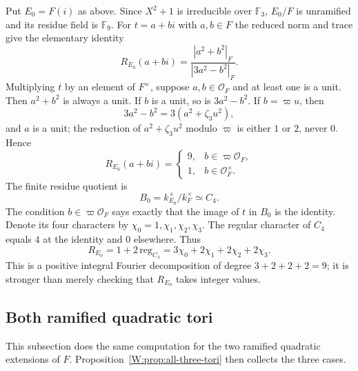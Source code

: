 Put $E_0=F(i)$ as above.  Since $X^2+1$ is irreducible over
$\mathbb F_3$, $E_0/F$ is unramified and its residue field is
$\mathbb F_9$.  For $t=a+bi$ with $a,b\in F$ the reduced norm
and trace give the elementary identity
\begin{equation}\label{W:eq:quadratic-R}
 R_{E_0}(a+bi)=
 \frac{|a^2+b^2|_F}{|3a^2-b^2|_F}.
\end{equation}
Multiplying $t$ by an element of $F^\times$, suppose
$a,b\in\mathcal O_F$ and at least one is a unit.
Then $a^2+b^2$ is always a unit.  If $b$ is a unit, so is
$3a^2-b^2$.  If $b=\varpi u$, then
\[
 3a^2-b^2=3(a^2+\zeta_3u^2),
\]
and $a$ is a unit; the reduction of $a^2+\zeta_3u^2$ modulo
$\varpi$ is either $1$ or $2$, never $0$.  Hence
\begin{equation}\label{W:eq:unram-values}
 R_{E_0}(a+bi)=
 \begin{cases}
 9,&b\in\varpi\mathcal O_F,\\
 1,&b\in\mathcal O_F^\times.
 \end{cases}
\end{equation}
The finite residue quotient is
\[
 B_0=k_{E_0}^\times/k_F^\times
 \simeq C_4.
\]
The condition $b\in\varpi\mathcal O_F$ says exactly that the
image of $t$ in $B_0$ is the identity.  Denote its four characters
by $\chi_0=1,\chi_1,\chi_2,\chi_3$.  The regular character of
$C_4$ equals $4$ at the identity and $0$ elsewhere. Thus
\begin{equation}\label{W:eq:unram-fourier}
 \boxed{\quad
 R_{E_0}=1+2\,\mathrm{reg}_{C_4}
 =3\chi_0+2\chi_1+2\chi_2+2\chi_3.
 \quad}
\end{equation}
This is a positive integral Fourier decomposition of degree
$3+2+2+2=9$; it is stronger than merely checking that
$R_{E_0}$ takes integer values.

\subsection{Both ramified quadratic tori}
This subsection does the same computation for the two ramified quadratic extensions of $F$. Proposition~\ref{W:prop:all-three-tori} then collects the three cases.

